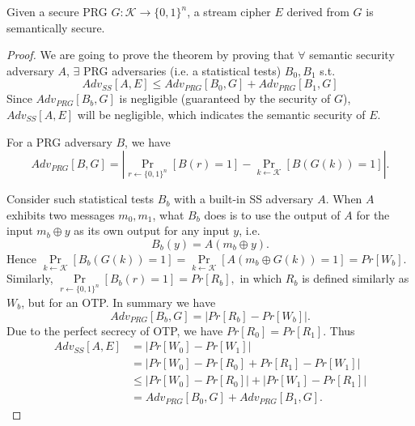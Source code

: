 \begin{theorem}
Given a secure PRG $G:\mathcal{K}\rightarrow\{0,1\}^n$, a stream cipher $E$ derived from $G$ is semantically secure. 
\end{theorem} 
\begin{proof}
We are going to prove the theorem by proving that $\forall$ semantic security adversary $A$, $\exists$ PRG adversaries (i.e. a statistical tests) $B_0,B_1$ s.t.
\[Adv_{SS}[A,E]\leq Adv_{PRG}[B_0,G]+Adv_{PRG}[B_1,G]\]
Since $Adv_{PRG}[B_b,G]$ is negligible (guaranteed by the security of $G$), $Adv_{SS}[A,E]$ will be negligible, which indicates the semantic security of $E$. 

For a PRG adversary $B$, we have 
\[Adv_{PRG}[B,G]=\left\lvert\mathop{Pr}\limits_{r\leftarrow\{0,1\}^n}[B(r)=1]-\mathop{Pr}\limits_{k\leftarrow\mathcal{K}}[B(G(k))=1]\right\rvert.\]

Consider such statistical tests $B_b$ with a built-in SS adversary $A$. When $A$ exhibits two messages $m_0,m_1$, what $B_b$ does is to use the output of $A$ for the input $m_b\oplus y$ as its own output for any input $y$, i.e.
\[B_b(y)=A(m_b\oplus y).\]
Hence $\mathop{Pr}\limits_{k\leftarrow\mathcal{K}}[B_b(G(k))=1]=\mathop{Pr}\limits_{k\leftarrow\mathcal{K}}[A(m_b\oplus G(k))=1]=Pr[W_b].$ Similarly, $\mathop{Pr}\limits_{r\leftarrow\{0,1\}^n}[B_b(r)=1]=Pr[R_b],$ in which $R_b$ is defined similarly as $W_b$, but for an OTP. In summary we have 
\[Adv_{PRG}[B_b,G]=\left\lvert Pr[R_b]-Pr[W_b]\right\rvert.\]
Due to the perfect secrecy of OTP, we have $Pr[R_0]=Pr[R_1]$. Thus
\begin{align*}
Adv_{SS}[A,E]&=\left\lvert Pr[W_0]-Pr[W_1]\right\rvert\\
&=\left\lvert Pr[W_0]-Pr[R_0]+Pr[R_1]-Pr[W_1]\right\rvert\\
&\leq\left\lvert Pr[W_0]-Pr[R_0]\right\rvert+\left\lvert Pr[W_1]-Pr[R_1]\right\rvert\\
&=Adv_{PRG}[B_0,G]+Adv_{PRG}[B_1,G].
\end{align*}
\end{proof}
\ifx\PREAMBLE\undefined

\fi